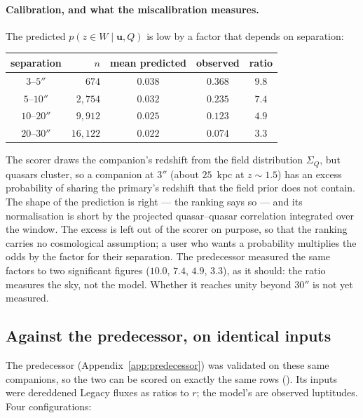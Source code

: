 \documentclass[11pt,a4paper]{article}
\newcommand{\uvec}{\mathbf{u}}
\newcommand{\Sq}{\Sigma_{Q}}
\begin{document}
\paragraph{Calibration, and what the miscalibration measures.} The predicted
$p(z\in W\mid\uvec,Q)$ is low by a factor that depends on separation:

\begin{center}
\begin{tabular}{crccc}
\toprule
separation & $n$ & mean predicted & observed & ratio \\
\midrule
$3$--$5''$   & $674$      & $0.038$ & $0.368$ & $9.8$ \\
$5$--$10''$  & $2{,}754$  & $0.032$ & $0.235$ & $7.4$ \\
$10$--$20''$ & $9{,}912$  & $0.025$ & $0.123$ & $4.9$ \\
$20$--$30''$ & $16{,}122$ & $0.022$ & $0.074$ & $3.3$ \\
\bottomrule
\end{tabular}
\end{center}

\noindent
The scorer draws the companion's redshift from the field distribution $\Sq$, but
quasars cluster, so a companion at $3''$ (about $25$~kpc at $z\sim1.5$) has an
excess probability of sharing the primary's redshift that the field prior does
not contain. The shape of the prediction is right --- the ranking says so --- and
its normalisation is short by the projected quasar--quasar correlation
integrated over the window. The excess is left out of the scorer on purpose, so
that the ranking carries no cosmological assumption; a user who wants a
probability multiplies the odds by the factor for their separation. The
predecessor measured the same factors to two significant figures ($10.0$, $7.4$,
$4.9$, $3.3$), as it should: the ratio measures the sky, not the model. Whether
it reaches unity beyond $30''$ is not yet measured.

\subsection{Against the predecessor, on identical inputs}
\label{sec:predecessor-compare}

The predecessor (Appendix~\ref{app:predecessor}) was validated on these same
companions, so the two can be scored on exactly the same rows
(). Its inputs were dereddened
Legacy fluxes as ratios to $r$; the model's are observed luptitudes. Four
configurations:
\end{document}
